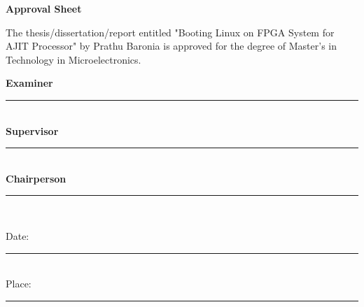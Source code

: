 \thispagestyle{empty}

\begin{center}
{\Large \textbf{Approval Sheet}}%
\end{center}

\setlength{\parindent}{0em}
The thesis/dissertation/report entitled "Booting Linux on FPGA System for AJIT Processor" by Prathu Baronia is approved for the degree of
Master's in Technology in Microelectronics.

\begin{flushright}
\textbf{Examiner} \\
\vspace{2cm}
\rule{8cm}{.4pt}\\
\vspace{2cm}
\textbf{Supervisor} \\
\vspace{2cm}
\rule{8cm}{.4pt}\\
\vspace{2cm}
\textbf{Chairperson} \\
\vspace{2cm}
\rule{8cm}{.4pt}\\
\vspace{2cm}
\end{flushright}

\begin{flushleft}
Date: \rule{4cm}{.4pt}\\
Place: \rule{4cm}{.4pt}\\
\end{flushleft}

\afterpage{\blankpage}
\clearpage

